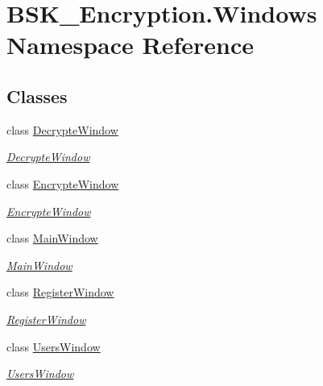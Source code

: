 \hypertarget{namespace_b_s_k___encryption_1_1_windows}{}\section{B\+S\+K\+\_\+\+Encryption.\+Windows Namespace Reference}
\label{namespace_b_s_k___encryption_1_1_windows}
\subsection*{Classes}
\begin{DoxyCompactItemize}
\item 
class \mbox{\hyperlink{class_b_s_k___encryption_1_1_windows_1_1_decrypte_window}{Decrypte\+Window}}
\begin{DoxyCompactList}\small\item\em \mbox{\hyperlink{class_b_s_k___encryption_1_1_windows_1_1_decrypte_window}{Decrypte\+Window}} \end{DoxyCompactList}\item 
class \mbox{\hyperlink{class_b_s_k___encryption_1_1_windows_1_1_encrypte_window}{Encrypte\+Window}}
\begin{DoxyCompactList}\small\item\em \mbox{\hyperlink{class_b_s_k___encryption_1_1_windows_1_1_encrypte_window}{Encrypte\+Window}} \end{DoxyCompactList}\item 
class \mbox{\hyperlink{class_b_s_k___encryption_1_1_windows_1_1_main_window}{Main\+Window}}
\begin{DoxyCompactList}\small\item\em \mbox{\hyperlink{class_b_s_k___encryption_1_1_windows_1_1_main_window}{Main\+Window}} \end{DoxyCompactList}\item 
class \mbox{\hyperlink{class_b_s_k___encryption_1_1_windows_1_1_register_window}{Register\+Window}}
\begin{DoxyCompactList}\small\item\em \mbox{\hyperlink{class_b_s_k___encryption_1_1_windows_1_1_register_window}{Register\+Window}} \end{DoxyCompactList}\item 
class \mbox{\hyperlink{class_b_s_k___encryption_1_1_windows_1_1_users_window}{Users\+Window}}
\begin{DoxyCompactList}\small\item\em \mbox{\hyperlink{class_b_s_k___encryption_1_1_windows_1_1_users_window}{Users\+Window}} \end{DoxyCompactList}\end{DoxyCompactItemize}
